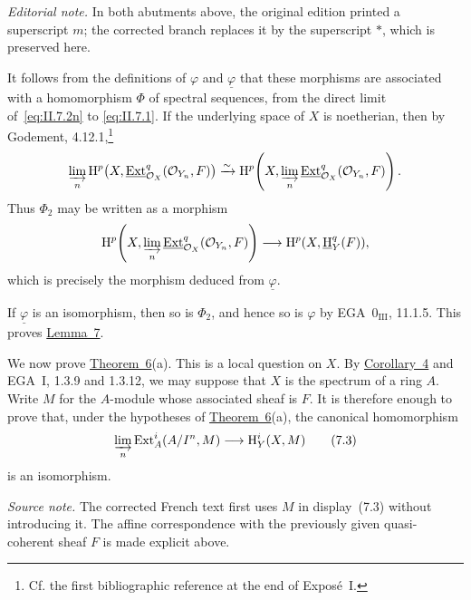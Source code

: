 \documentclass[11pt,a4paper,oneside]{book}
\providecommand{\srcpage}[1]{%
  \marginpar{\raggedright\scriptsize\color{gray}Original French p.~#1}}
\providecommand{\uExt}{\mathop{\underline{\mathrm{Ext}}}\nolimits}
\providecommand{\uH}{\mathop{\underline{\mathrm H}}\nolimits}
\providecommand{\OX}{\mathcal O_X}
\providecommand{\Ext}{\operatorname{Ext}}
\theoremstyle{plain}
\theoremstyle{definition}
\theoremstyle{remark}
\begin{document}
\noindent\textit{Editorial note.} In both abutments above, the original
edition printed a superscript $m$; the corrected branch replaces it by the
superscript $*$, which is preserved here.

It follows from the definitions of $\varphi$ and $\underline{\varphi}$ that
these morphisms are associated with a homomorphism $\Phi$ of spectral
sequences, from the direct limit of~\eqref{eq:II.7.2n} to
\eqref{eq:II.7.1}. If the underlying space of $X$ is noetherian, then by
Godement, 4.12.1,\footnote{Cf. the first bibliographic reference at the end
of Expos\'e~I.}
\[
  \varinjlim_n
    \mathrm H^p\bigl(X,\uExt_{\OX}^q(\mathcal O_{Y_n},F)\bigr)
  \xrightarrow{\sim}
  \mathrm H^p\!\left(
    X,\varinjlim_n\uExt_{\OX}^q(\mathcal O_{Y_n},F)\right).
\]
Thus $\Phi_2$ may be written as a morphism
\[
  \mathrm H^p\!\left(
    X,\varinjlim_n\uExt_{\OX}^q(\mathcal O_{Y_n},F)\right)
  \longrightarrow \mathrm H^p(X,\uH_Y^q(F)),
\]
which is precisely the morphism deduced from $\underline{\varphi}$.

If $\underline{\varphi}$\srcpage{23} is an isomorphism, then so is
$\Phi_2$, and hence so is $\varphi$ by EGA~$0_{\mathrm{III}}$, 11.1.5.
This proves \hyperref[II.7]{Lemma~7}.

We now prove \hyperref[II.6]{Theorem~6}(a). This is a local question on $X$. By \hyperref[II.4]{Corollary~4}
and EGA~I, 1.3.9 and 1.3.12, we may suppose that $X$ is the spectrum of a
ring $A$. Write $M$ for the $A$-module whose associated sheaf is $F$. It is
therefore enough to prove that, under the hypotheses of \hyperref[II.6]{Theorem~6}(a), the
canonical homomorphism
\begin{equation}
  \varinjlim_n\Ext_A^i(A/I^n,M)
  \longrightarrow \mathrm H_Y^i(X,M)
  \tag{7.3}\label{eq:II.7.3}
\end{equation}
is an isomorphism.

\noindent\textit{Source note.} The corrected French text first uses $M$ in
display~(7.3) without introducing it. The affine correspondence with the
previously given quasi-coherent sheaf $F$ is made explicit above.
\end{document}
